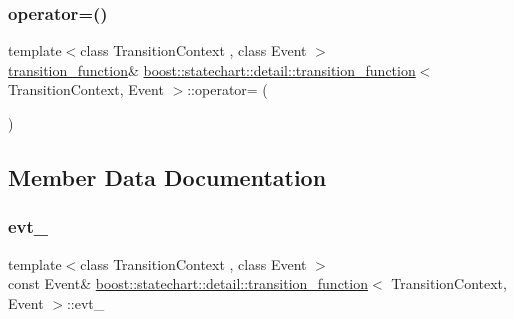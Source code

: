 \mbox{\label{classboost_1_1statechart_1_1detail_1_1transition__function_a7ef5049fdc638389bc59dfd8d1c4dab1}} 
\subsubsection{\texorpdfstring{operator=()}{operator=()}}
{\footnotesize\ttfamily template$<$class Transition\+Context , class Event $>$ \\
\mbox{\hyperlink{classboost_1_1statechart_1_1detail_1_1transition__function}{transition\+\_\+function}}\& \mbox{\hyperlink{classboost_1_1statechart_1_1detail_1_1transition__function}{boost\+::statechart\+::detail\+::transition\+\_\+function}}$<$ Transition\+Context, Event $>$\+::operator= (\begin{DoxyParamCaption}\item[{const \mbox{\hyperlink{classboost_1_1statechart_1_1detail_1_1transition__function}{transition\+\_\+function}}$<$ Transition\+Context, Event $>$ \&}]{ }\end{DoxyParamCaption})\hspace{0.3cm}{\ttfamily [private]}}



\subsection{Member Data Documentation}
\mbox{\label{classboost_1_1statechart_1_1detail_1_1transition__function_a161632f44a80b8df7ea554b727cc3713}} 
\subsubsection{\texorpdfstring{evt\+\_\+}{evt\_}}
{\footnotesize\ttfamily template$<$class Transition\+Context , class Event $>$ \\
const Event\& \mbox{\hyperlink{classboost_1_1statechart_1_1detail_1_1transition__function}{boost\+::statechart\+::detail\+::transition\+\_\+function}}$<$ Transition\+Context, Event $>$\+::evt\+\_\+\hspace{0.3cm}{\ttfamily [private]}}


